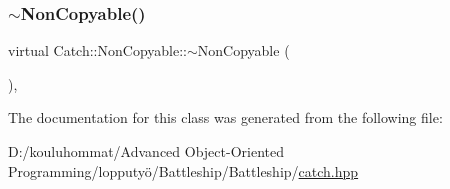 \mbox{\label{class_catch_1_1_non_copyable_a81254677280fef337eb4a676e91e3293}} 
\subsubsection{\texorpdfstring{$\sim$\+Non\+Copyable()}{~NonCopyable()}}
{\footnotesize\ttfamily virtual Catch\+::\+Non\+Copyable\+::$\sim$\+Non\+Copyable (\begin{DoxyParamCaption}{ }\end{DoxyParamCaption})\hspace{0.3cm}{\ttfamily [protected]}, {\ttfamily [virtual]}}



The documentation for this class was generated from the following file\+:\begin{DoxyCompactItemize}
\item 
D\+:/kouluhommat/\+Advanced Object-\/\+Oriented Programming/lopputyö/\+Battleship/\+Battleship/\mbox{\hyperlink{catch_8hpp}{catch.\+hpp}}\end{DoxyCompactItemize}
